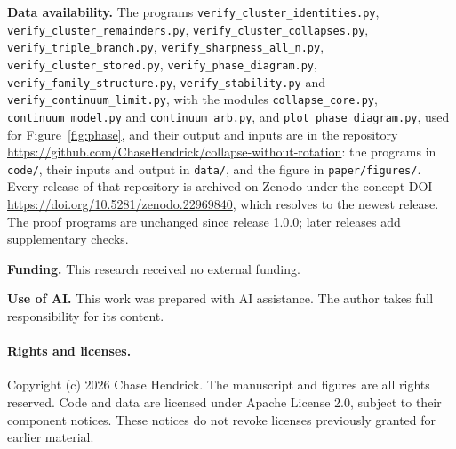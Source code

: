 \documentclass[11pt]{article}
\theoremstyle{definition}
\begin{document}
\medskip
{\raggedright\noindent\textbf{Data availability.} The programs \texttt{verify\_\allowbreak cluster\_\allowbreak identities.py}, \texttt{verify\_\allowbreak cluster\_\allowbreak remainders.py}, \texttt{verify\_\allowbreak cluster\_\allowbreak collapses.py}, \texttt{verify\_\allowbreak triple\_\allowbreak branch.py}, \texttt{verify\_\allowbreak sharpness\_\allowbreak all\_\allowbreak n.py}, \texttt{verify\_\allowbreak cluster\_\allowbreak stored.py}, \texttt{verify\_\allowbreak phase\_\allowbreak diagram.py}, \texttt{verify\_\allowbreak family\_\allowbreak structure.py}, \texttt{verify\_\allowbreak stability.py} and \texttt{verify\_\allowbreak continuum\_\allowbreak limit.py}, with the modules \texttt{collapse\_\allowbreak core.py}, \texttt{continuum\_\allowbreak model.py} and \texttt{continuum\_\allowbreak arb.py}, and \texttt{plot\_\allowbreak phase\_\allowbreak diagram.py}, used for Figure~\ref{fig:phase}, and their output and inputs are in the repository \url{https://github.com/ChaseHendrick/collapse-without-rotation}: the programs in \texttt{code/}, their inputs and output in \texttt{data/}, and the figure in \texttt{paper/figures/}. Every release of that repository is archived on Zenodo under the concept DOI \url{https://doi.org/10.5281/zenodo.22969840}, which resolves to the newest release. The proof programs are unchanged since release 1.0.0; later releases add supplementary checks.\par}

\noindent\textbf{Funding.} This research received no external funding.

\noindent\textbf{Use of AI.} This work was prepared with AI assistance. The author takes full responsibility for its content.

\paragraph{Rights and licenses.}
Copyright (c) 2026 Chase Hendrick. The manuscript and figures are all rights reserved. Code and data are licensed under Apache License 2.0, subject to their component notices. These notices do not revoke licenses previously granted for earlier material.
\end{document}
